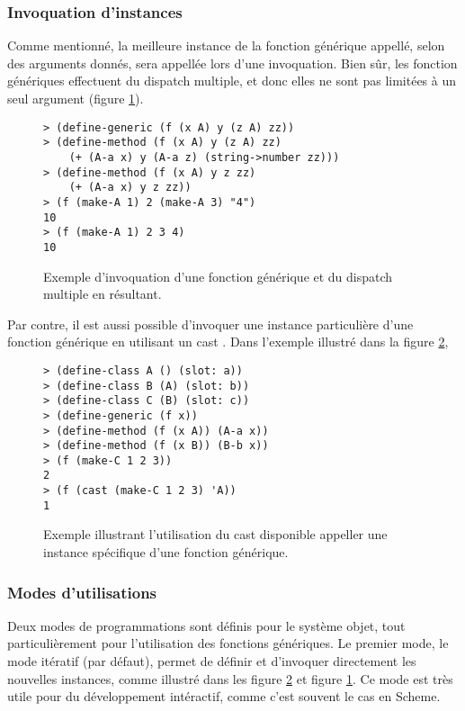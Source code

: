 \documentclass[letterpaper,12pt]{book}
\begin{document}
      \subsubsection{Invoquation d'instances}

        Comme mentionné, la meilleure instance de la fonction
        générique appellé, selon des arguments donnés, sera appellée
        lors d'une invoquation. Bien sûr, les fonction génériques
        effectuent du \og dispatch \fg multiple, et donc elles ne sont
        pas limitées à un seul argument (figure \ref{ex-multdisp}).

        \begin{figure}[h!]
          \begin{lstlisting}
> (define-generic (f (x A) y (z A) zz))
> (define-method (f (x A) y (z A) zz)
    (+ (A-a x) y (A-a z) (string->number zz)))
> (define-method (f (x A) y z zz)
    (+ (A-a x) y z zz))
> (f (make-A 1) 2 (make-A 3) "4")
10
> (f (make-A 1) 2 3 4)
10
          \end{lstlisting}
          \caption{Exemple d'invoquation d'une fonction générique et
            du \og dispatch \fg multiple en résultant.}
          \label{ex-multdisp}
        \end{figure}
        
        Par contre, il est aussi possible d'invoquer une instance
        particulière d'une fonction générique en utilisant un \og cast
        \fg. Dans l'exemple illustré dans la figure \ref{ex-cast},

        \begin{figure}[h!]
          \begin{lstlisting}
> (define-class A () (slot: a))
> (define-class B (A) (slot: b))
> (define-class C (B) (slot: c))
> (define-generic (f x))
> (define-method (f (x A)) (A-a x))
> (define-method (f (x B)) (B-b x))
> (f (make-C 1 2 3))
2
> (f (cast (make-C 1 2 3) 'A))
1
          \end{lstlisting}
          \caption{Exemple illustrant l'utilisation du \og cast \fg
            disponible appeller une instance spécifique d'une fonction
            générique.}
          \label{ex-cast}
        \end{figure}

      \subsubsection{Modes d'utilisations}

        Deux modes de programmations sont définis pour le système
        objet, tout particulièrement pour l'utilisation des fonctions
        génériques. Le premier mode, le mode itératif (par défaut),
        permet de définir et d'invoquer directement les nouvelles
        instances, comme illustré dans les figure \ref{ex-cast} et
        figure \ref{ex-multdisp}. Ce mode est très utile pour du
        développement intéractif, comme c'est souvent le cas en
        Scheme. 
\end{document}
